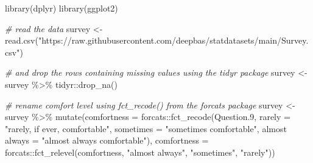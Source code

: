 \documentclass[
]{book}
\newenvironment{Shaded}{\begin{snugshade}}{\end{snugshade}}
\newcommand{\AttributeTok}[1]{\textcolor[rgb]{0.77,0.63,0.00}{#1}}
\newcommand{\CommentTok}[1]{\textcolor[rgb]{0.56,0.35,0.01}{\textit{#1}}}
\newcommand{\FloatTok}[1]{\textcolor[rgb]{0.00,0.00,0.81}{#1}}
\newcommand{\FunctionTok}[1]{\textcolor[rgb]{0.00,0.00,0.00}{#1}}
\newcommand{\NormalTok}[1]{#1}
\newcommand{\OtherTok}[1]{\textcolor[rgb]{0.56,0.35,0.01}{#1}}
\newcommand{\SpecialCharTok}[1]{\textcolor[rgb]{0.00,0.00,0.00}{#1}}
\newcommand{\StringTok}[1]{\textcolor[rgb]{0.31,0.60,0.02}{#1}}
\begin{document}
\begin{Shaded}
\begin{Highlighting}[]
\FunctionTok{library}\NormalTok{(dplyr)}
\FunctionTok{library}\NormalTok{(ggplot2)}

\CommentTok{\# read the data }
\NormalTok{survey }\OtherTok{\textless{}{-}} \FunctionTok{read.csv}\NormalTok{(}\StringTok{"https://raw.githubusercontent.com/deepbas/statdatasets/main/Survey.csv"}\NormalTok{) }

\CommentTok{\# and drop the rows containing missing values using the tidyr package}
\NormalTok{survey }\OtherTok{\textless{}{-}}\NormalTok{ survey }\SpecialCharTok{\%\textgreater{}\%}\NormalTok{ tidyr}\SpecialCharTok{::}\FunctionTok{drop\_na}\NormalTok{()}

\CommentTok{\# rename comfort level using fct\_recode() from the forcats package}
\NormalTok{survey }\OtherTok{\textless{}{-}}\NormalTok{ survey }\SpecialCharTok{\%\textgreater{}\%} \FunctionTok{mutate}\NormalTok{(}\AttributeTok{comfortness =}\NormalTok{ forcats}\SpecialCharTok{::}\FunctionTok{fct\_recode}\NormalTok{(Question}\FloatTok{.9}\NormalTok{, }
                          \StringTok{\textasciigrave{}}\AttributeTok{rarely}\StringTok{\textasciigrave{}} \OtherTok{=} \StringTok{"rarely, if ever, comfortable"}\NormalTok{,}
                          \StringTok{\textasciigrave{}}\AttributeTok{sometimes}\StringTok{\textasciigrave{}} \OtherTok{=} \StringTok{"sometimes comfortable"}\NormalTok{,}
                          \StringTok{\textasciigrave{}}\AttributeTok{almost always}\StringTok{\textasciigrave{}} \OtherTok{=} \StringTok{"almost always comfortable"}\NormalTok{),}
                          \AttributeTok{comfortness =}\NormalTok{ forcats}\SpecialCharTok{::}\FunctionTok{fct\_relevel}\NormalTok{(comfortness, }
                                                             \StringTok{"almost always"}\NormalTok{,}
                                                             \StringTok{"sometimes"}\NormalTok{, }
                                                             \StringTok{"rarely"}\NormalTok{))}


\end{Highlighting}
\end{Shaded}
\end{document}
